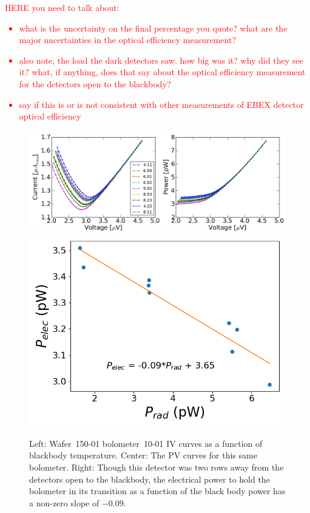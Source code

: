 \textcolor{red}{HERE you need to talk about:
\begin{itemize}
\item what is the uncertainty on the final percentage you quote? what are the major uncertainties in the optical efficiency measurement?
\item also note, the load the dark detectors saw. how big was it? why did they see it? what, if anything, does that say about the optical efficiency measurement for the detectors open to the blackbody? 
\item say if this is or is not consistent with other measurements of EBEX detector optical efficiency
\end{itemize}
 }


\begin{figure}[htp]
\begin{center}
\includegraphics[width=0.65\columnwidth]{figures/SqCh7_Ch5_all_bb_curves.png}
\includegraphics[width=0.33\columnwidth]{figures/SqCh7_Ch5_p_vs_p.png}
\caption{Left: Wafer~150-01 bolometer~10-01 IV curves as a function of blackbody temperature. Center: The PV curves for this same bolometer. Right: Though this detector was two rows away from the detectors open to the blackbody, the electrical power to hold the bolometer in its transition as a function of the black body power has a non-zero slope of $-0.09$. 
\label{fig:dark_pelec_vs_popt} }
\end{center}
\end{figure}


%


